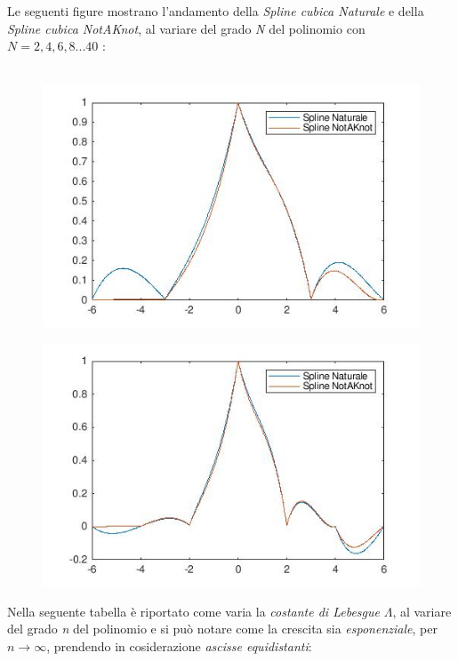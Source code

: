 Le seguenti figure mostrano l'andamento della \textit{Spline cubica Naturale} e della \textit{Spline cubica NotAKnot}, al variare del grado \textit{N} del polinomio con $N=2,4,6,8...40$ :\\\
	\begin{figure}[h]
		\includegraphics[width=\textwidth]{Plot/Cap_4_Es_9_(n_4)}
	\end{figure}
	\begin{figure}[h]
		\includegraphics[width=\textwidth]{Plot/Cap_4_Es_9_(n_6)}
	\end{figure}
Nella seguente tabella è riportato come varia la \textit{costante di Lebesgue} $\Lambda$, al variare del grado \textit{n} del polinomio e si può notare come la crescita sia \textit{esponenziale}, per $n\rightarrow\infty$, prendendo in cosiderazione \textit{ascisse equidistanti}:\\\
